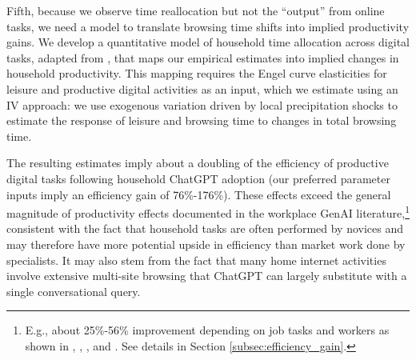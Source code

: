 \documentclass[12pt]{article}
\begin{document}

Fifth, because we observe time reallocation but not the ``output'' from online tasks, we need a model to translate browsing time shifts into implied productivity gains. We develop a quantitative model of household time allocation across digital tasks, adapted from \cite{aguiar2021}, that maps our empirical estimates into implied changes in household productivity. This mapping requires the Engel curve elasticities for leisure and productive digital activities as an input, which we estimate using an IV approach: we use exogenous variation driven by local precipitation shocks to estimate the response of leisure and browsing time to changes in total browsing time.

The resulting estimates imply about a doubling of the efficiency of productive digital tasks following household ChatGPT adoption (our preferred parameter inputs imply an efficiency gain of 76\%-176\%). These effects exceed the general magnitude of productivity effects documented in the workplace GenAI literature,\footnote{E.g., about 25\%-56\% improvement depending on job tasks and workers as shown in \cite{noy2023}, \cite{brynjolfsson2023}, \cite{dell2023}, and \cite{peng2023}. See details in Section \ref{subsec:efficiency_gain}.} consistent with the fact that household tasks are often performed by novices and may therefore have more potential upside in efficiency than market work done by specialists. It may also stem from the fact that many home internet activities involve extensive multi-site browsing that ChatGPT can largely substitute with a single conversational query. 
\end{document}
